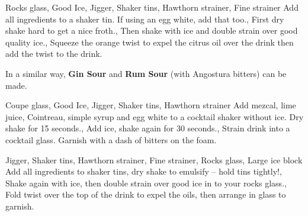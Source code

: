 \documentclass[../main.tex]{subfiles}
\begin{document}
\clearpage
{}

{Rocks glass, Good Ice, Jigger, Shaker tins, Hawthorn strainer, Fine strainer}
{
    {Add all ingredients to a shaker tin. If using an egg white, add that too.},
    {First dry shake hard to get a nice froth.},
    {Then shake with ice and double strain over good quality ice.},
    {Squeeze the orange twist to expel the citrus oil over the drink then add the twist to the drink.}
}

\begin{center}
    In a similar way, \textbf{Gin Sour} and \textbf{Rum Sour} (with Angostura bitters) can be made.
\end{center}

{Coupe glass, Good Ice, Jigger, Shaker tins, Hawthorn strainer}
{
    {Add mezcal, lime juice, Cointreau, simple syrup and egg white to a cocktail shaker without ice. Dry shake for 15 seconds.},
    {Add ice, shake again for 30 seconds.},
    {Strain drink into a cocktail glass. Garnish with a dash of bitters on the foam.}
}

%
{Jigger, Shaker tins, Hawthorn strainer, Fine strainer, Rocks glass, Large ice block}
%
{
	{Add all ingredients to shaker tins, dry shake to emulsify -- hold tins tightly!},
	{Shake again with ice, then double strain over good ice in to your rocks glass}.,
	{Fold twist over the top of the drink to expel the oils, then arrange in glass to garnish.}
}
\end{document}
